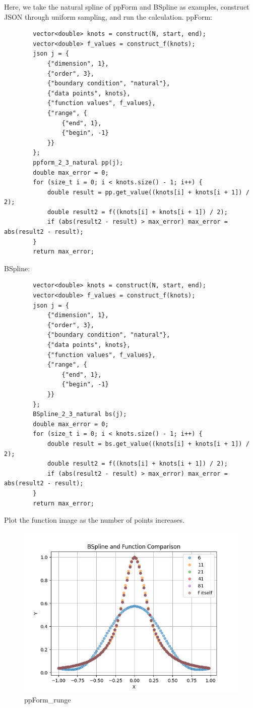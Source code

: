 \documentclass[a4paper]{article}
\begin{document}
    Here, we take the natural spline of ppForm and BSpline as examples, construct JSON through uniform sampling, and run the calculation.
    ppForm:
    \begin{verbatim}
        vector<double> knots = construct(N, start, end);
        vector<double> f_values = construct_f(knots);
        json j = {
            {"dimension", 1},
            {"order", 3},
            {"boundary condition", "natural"},
            {"data points", knots},
            {"function values", f_values},
            {"range", {
                {"end", 1},
                {"begin", -1}
            }}
        };
        ppform_2_3_natural pp(j);
        double max_error = 0;
        for (size_t i = 0; i < knots.size() - 1; i++) {
            double result = pp.get_value((knots[i] + knots[i + 1]) / 2);
            double result2 = f((knots[i] + knots[i + 1]) / 2);
            if (abs(result2 - result) > max_error) max_error = abs(result2 - result);
        }
        return max_error;
    \end{verbatim}
    BSpline:
    \begin{verbatim}
        vector<double> knots = construct(N, start, end);
        vector<double> f_values = construct_f(knots);
        json j = {
            {"dimension", 1},
            {"order", 3},
            {"boundary condition", "natural"},
            {"data points", knots},
            {"function values", f_values},
            {"range", {
                {"end", 1},
                {"begin", -1}
            }}
        };
        BSpline_2_3_natural bs(j);
        double max_error = 0;
        for (size_t i = 0; i < knots.size() - 1; i++) {
            double result = bs.get_value((knots[i] + knots[i + 1]) / 2);
            double result2 = f((knots[i] + knots[i + 1]) / 2);
            if (abs(result2 - result) > max_error) max_error = abs(result2 - result);
        }
        return max_error;
    \end{verbatim}
    Plot the function image as the number of points increases.
    \begin{figure}[H] 
        \centering
        \includegraphics{../figure/ppForm_runge.png} 
        \caption{ppForm\_runge} 
    \end{figure}
\end{document}
